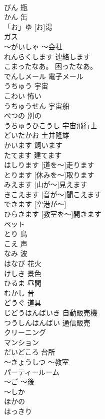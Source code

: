 \documentclass[8pt]{extreport}
\begin{document}
\begin{CJK}{UTF8}{min}
\\	びん	瓶	
\\	かん	缶	
\\	「お」ゆ	[お]湯	
\\	ガス			
\\	～がいしゃ	～会社	
\\	れんらくします	連絡します	
\\	こまったなあ。	困ったなあ。	
\\	でんしメール	電子メール	
\\	うちゅう	宇宙	
\\	こわい	怖い	
\\	うちゅうせん	宇宙船	
\\	べつの	別の	
\\	うちゅうひこうし	宇宙飛行士	
\\	どいたかお	土井隆雄	
\\	かいます	飼います	
\\	たてます	建てます	
\\	[みちを～]はしります	[道を～]走ります	
\\	[やすみを～]とります	[休みを～]取ります	
\\	[やまが～] みえます	[山が～]見えます	
\\	[おとが～]きこえます	[音が～]聞こえます	
\\	[くうこうが～]できます	[空港が～]	
\\	[きょうしつを～]ひらきます	[教室を～]開きます	
\\	ペット			
\\	とり	鳥	
\\	こえ	声	
\\	なみ	波	
\\	はなび	花火	
\\	けしき	景色	
\\	ひるま	昼間	
\\	むかし	昔	
\\	どうぐ	道具	
\\	じどうはんばいき	自動販売機	
\\	つうしんはんばい	通信販売	
\\	クリーニング			
\\	マンション			
\\	だいどころ	台所	
\\	～きょうしつ	～教室	
\\	パーティールーム			
\\	～ご	～後	
\\	～しか			
\\	ほかの			
\\	はっきり			

\end{CJK}
\end{document}

